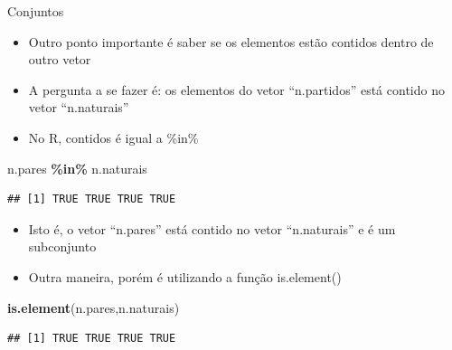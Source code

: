 \documentclass[
  10pt,
  ignorenonframetext,
]{beamer}
\newenvironment{Shaded}{\begin{snugshade}}{\end{snugshade}}
\newcommand{\KeywordTok}[1]{\textcolor[rgb]{0.13,0.29,0.53}{\textbf{#1}}}
\newcommand{\NormalTok}[1]{#1}
\newcommand{\OperatorTok}[1]{\textcolor[rgb]{0.81,0.36,0.00}{\textbf{#1}}}
\newcommand{\StringTok}[1]{\textcolor[rgb]{0.31,0.60,0.02}{#1}}
\providecommand{\tightlist}{%
  \setlength{\itemsep}{0pt}\setlength{\parskip}{0pt}}
\begin{document}
\begin{frame}[fragile]{Conjuntos}
\protect\hypertarget{conjuntos-1}{}
\begin{itemize}
\tightlist
\item
  Outro ponto importante é saber se os elementos estão contidos dentro
  de outro vetor
\item
  A pergunta a se fazer é: os elementos do vetor ``n.partidos'' está
  contido no vetor ``n.naturais''
\item
  No R, contidos é igual a \%in\%
\end{itemize}

\begin{Shaded}
\begin{Highlighting}[]
\NormalTok{n.pares }\OperatorTok{\%in\%}\StringTok{ }\NormalTok{n.naturais}
\end{Highlighting}
\end{Shaded}

\begin{verbatim}
## [1] TRUE TRUE TRUE TRUE
\end{verbatim}

\begin{itemize}
\tightlist
\item
  Isto é, o vetor ``n.pares'' está contido no vetor ``n.naturais'' e é
  um subconjunto
\item
  Outra maneira, porém é utilizando a função is.element()
\end{itemize}

\begin{Shaded}
\begin{Highlighting}[]
\KeywordTok{is.element}\NormalTok{(n.pares,n.naturais)}
\end{Highlighting}
\end{Shaded}

\begin{verbatim}
## [1] TRUE TRUE TRUE TRUE
\end{verbatim}
\end{frame}
\end{document}
